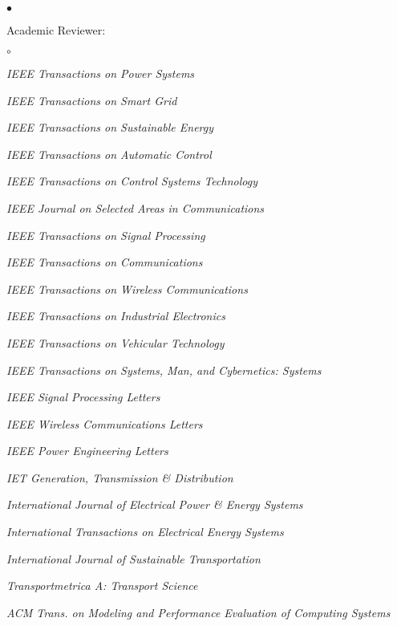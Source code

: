\documentclass[margin,line]{res}
\newenvironment{list2}{
  \begin{list}{$\bullet$}{%
      \setlength{\itemsep}{0in}
      \setlength{\parsep}{0in} \setlength{\parskip}{0in}
      \setlength{\topsep}{0in} \setlength{\partopsep}{0in}
      \setlength{\leftmargin}{0.10in}}}{\end{list}}
\newenvironment{list3}{
  \begin{list}{$\circ$}{%
      \setlength{\itemsep}{0in}
      \setlength{\parsep}{0in} \setlength{\parskip}{0in}
      \setlength{\topsep}{0in} \setlength{\partopsep}{0in}
      \setlength{\leftmargin}{0.28in}}}{\end{list}}
\begin{document}
\begin{resume}
\vspace{.3cm}



\section{}
\begin{list2}
\item Academic Reviewer:
\begin{list3}
\item \emph{IEEE Transactions on Power Systems}
\item \emph{IEEE Transactions on Smart Grid}
\item \emph{IEEE Transactions on Sustainable Energy}
\item \emph{IEEE Transactions on Automatic Control}
\item \emph{IEEE Transactions on Control Systems Technology}
\item \emph{IEEE Journal on Selected Areas in Communications}
\item \emph{IEEE Transactions on Signal Processing}
\item \emph{IEEE Transactions on Communications}
\item \emph{IEEE Transactions on Wireless Communications}
\item \emph{IEEE Transactions on Industrial Electronics}
\item \emph{IEEE Transactions on Vehicular Technology}
\item \emph{IEEE Transactions on Systems, Man, and Cybernetics: Systems}
\item \emph{IEEE Signal Processing Letters}
\item \emph{IEEE Wireless Communications Letters}
\item \emph{IEEE Power Engineering Letters}
\item \emph{IET Generation, Transmission \& Distribution}
\item \emph{International Journal of Electrical Power \& Energy Systems}
\item \emph{International Transactions on Electrical Energy Systems}
\item \emph{International Journal of Sustainable Transportation}
\item \emph{Transportmetrica A: Transport Science}
\item \emph{ACM Trans. on Modeling and Performance Evaluation of Computing Systems}

\end{list3}
\end{list2}
\end{resume}
\end{document}
